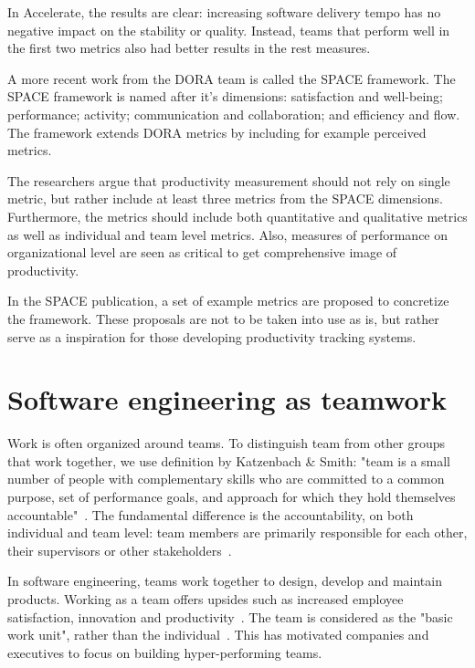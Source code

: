 In Accelerate, the results are clear: increasing software delivery tempo has no negative impact on the stability or quality. Instead, teams that perform well in the first two metrics also had better results in the rest measures. 

A more recent work from the DORA team is called the SPACE framework. The SPACE framework is named after it's dimensions: satisfaction and well-being; performance; activity; communication and collaboration; and efficiency and flow. The framework extends DORA metrics by including for example perceived metrics. 

The researchers argue that productivity measurement should not rely on single metric, but rather include at least three metrics from the SPACE dimensions. Furthermore, the metrics should include both quantitative and qualitative metrics as well as individual and team level metrics. Also, measures of performance on organizational level are seen as critical to get comprehensive image of productivity. 

In the SPACE publication, a set of example metrics are proposed to concretize the framework. These proposals are not to be taken into use as is, but rather serve as a inspiration for those developing productivity tracking systems.~\cite{forsgren_space_2021}

\section{Software engineering as teamwork}

Work is often organized around teams. To distinguish team from other groups that work together, we use definition by Katzenbach \& Smith: "team is a small number of people with complementary skills who are committed to a common purpose, set of performance goals, and approach for which they hold themselves accountable"~\cite{katzenbach_discipline_1993}. The fundamental difference is the accountability, on both individual and team level: team members are primarily responsible for each other, their supervisors or other stakeholders~\cite{katzenbach_discipline_1993}.

In software engineering, teams work together to design, develop and maintain products. Working as a team offers upsides such as increased employee satisfaction, innovation and productivity~\cite{moe_teamwork_2010}. The team is considered as the "basic work unit", rather than the individual~\cite{moe_overcoming_2010}. This has motivated companies and executives to focus on building hyper-performing teams.

